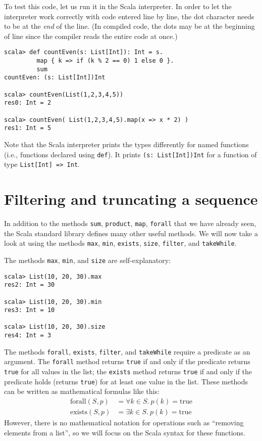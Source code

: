 To test this code, let us run it in the Scala interpreter. In order
to let the interpreter work correctly with code entered line by line,
the dot character needs to be at the \emph{end} of the line. (In compiled
code, the dots may be at the beginning of line since the compiler
reads the entire code at once.)
\begin{lstlisting}
scala> def countEven(s: List[Int]): Int = s.
         map { k => if (k % 2 == 0) 1 else 0 }.
         sum
countEven: (s: List[Int])Int

scala> countEven(List(1,2,3,4,5))
res0: Int = 2

scala> countEven( List(1,2,3,4,5).map(x => x * 2) )
res1: Int = 5
\end{lstlisting}
Note that the Scala interpreter prints the types differently for named
functions (i.e., functions declared using \lstinline!def!). It prints
\lstinline!(s: List[Int])Int! for a function of type \lstinline!List[Int] => Int!.

\section{Filtering and truncating a sequence }

In addition to the methods \lstinline!sum!, \lstinline!product!,
\lstinline!map!, \texttt{}\lstinline!forall! that we have already
seen, the Scala standard library defines many other useful methods.
We will now take a look at using the methods \lstinline!max!, \lstinline!min!,
\lstinline!exists!, \lstinline!size!, \lstinline!filter!, and \lstinline!takeWhile!. 

The methods \lstinline!max!, \lstinline!min!, and \texttt{}\lstinline!size!
are self-explanatory:
\begin{lstlisting}
scala> List(10, 20, 30).max
res2: Int = 30

scala> List(10, 20, 30).min
res3: Int = 10

scala> List(10, 20, 30).size
res4: Int = 3
\end{lstlisting}

The methods \lstinline!forall!, \lstinline!exists!, \lstinline!filter!,
and \texttt{}\lstinline!takeWhile! require a predicate as an argument.
The \texttt{}\lstinline!forall! method returns \texttt{}\lstinline!true!
if and only if the predicate returns \lstinline!true! for all values
in the list; the \texttt{}\lstinline!exists! method returns \texttt{}\lstinline!true!
if and only if the predicate holds (returns \lstinline!true!) for
at least one value in the list. These methods can be written as mathematical
formulas like this:
\begin{align*}
\text{forall}\left(S,p\right) & =\forall k\in S.~p(k)=\text{true}\\
\text{exists}\left(S,p\right) & =\exists k\in S.~p(k)=\text{true}
\end{align*}
However, there is no mathematical notation for operations such as
\textsf{``}removing elements from a list\textsf{''}, so we will focus on the Scala
syntax for these functions.

